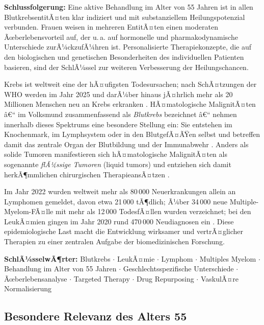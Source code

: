 ﻿\documentclass[12pt,a4paper]{article}
\theoremstyle{definition}
\begin{document}
\noindent
\textbf{Schlussfolgerung:} Eine aktive Behandlung im Alter von 55 Jahren ist in allen
BlutkrebsentitÃ¤ten klar indiziert und mit substanziellem Heilungspotenzial verbunden.
Frauen weisen in mehreren EntitÃ¤ten einen moderaten Ãœberlebensvorteil auf, der u.\,a.
auf hormonelle und pharmakodynamische Unterschiede zurÃ¼ckzufÃ¼hren ist. Personalisierte
Therapiekonzepte, die auf den biologischen und genetischen Besonderheiten des
individuellen Patienten basieren, sind der SchlÃ¼ssel zur weiteren Verbesserung der
Heilungschancen.

Krebs ist weltweit eine der hÃ¤ufigsten Todesursachen; nach SchÃ¤tzungen der WHO werden
im Jahr 2025 und darÃ¼ber hinaus jÃ¤hrlich mehr als 20 Millionen Menschen neu an Krebs
erkranken \cite{bray2018}. HÃ¤matologische MalignitÃ¤ten â€“ im Volksmund zusammenfassend
als \emph{Blutkrebs} bezeichnet â€“ nehmen innerhalb dieses Spektrums eine besondere
Stellung ein: Sie entstehen im Knochenmark, im Lymphsystem oder in den BlutgefÃ¤ÃŸen
selbst und betreffen damit das zentrale Organ der Blutbildung und der Immunabwehr
\cite{adeyemi2025}. Anders als solide Tumoren manifestieren sich hÃ¤matologische
MalignitÃ¤ten als sogenannte \emph{flÃ¼ssige Tumoren} (liquid tumors) und entziehen sich
damit herkÃ¶mmlichen chirurgischen TherapieansÃ¤tzen \cite{swerdlow2016}.

Im Jahr 2022 wurden weltweit mehr als 80\,000 Neuerkrankungen allein an Lymphomen
gemeldet, davon etwa 21\,000 tÃ¶dlich; Ã¼ber 34\,000 neue Multiple-Myelom-FÃ¤lle mit mehr
als 12\,000 TodesfÃ¤llen wurden verzeichnet; bei den LeukÃ¤mien gingen im Jahr 2020
rund 470\,000 Neudiagnosen ein \cite{adeyemi2025,siegel2023}. Diese epidemiologische
Last macht die Entwicklung wirksamer und vertrÃ¤glicher Therapien zu einer zentralen
Aufgabe der biomedizinischen Forschung.

\textbf{SchlÃ¼sselwÃ¶rter:} Blutkrebs $\cdot$ LeukÃ¤mie $\cdot$ Lymphom $\cdot$ Multiples Myelom
$\cdot$ Behandlung im Alter von 55 Jahren $\cdot$ Geschlechtsspezifische Unterschiede
$\cdot$ Ãœberlebensanalyse $\cdot$ Targeted Therapy $\cdot$ Drug Repurposing
$\cdot$ VaskulÃ¤re Normalisierung


\subsection{Besondere Relevanz des Alters 55}
\end{document}
